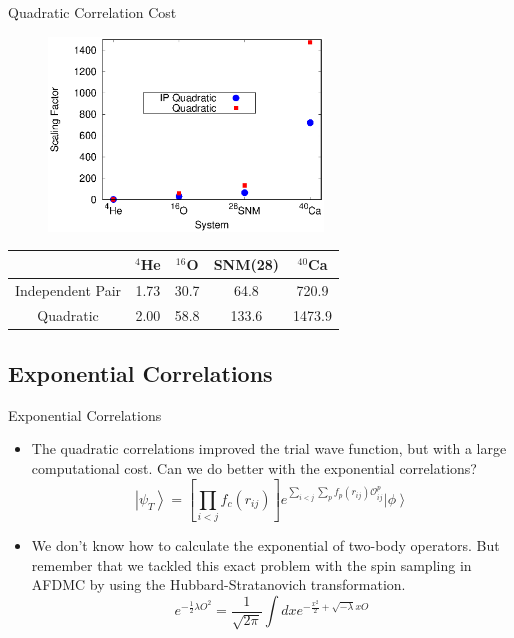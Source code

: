 \documentclass{beamer}
\newcommand{\ket}[1]{\left| #1 \right>}
\newcommand{\fpij}{f_p(r_{ij})}
\newcommand{\Opij}{\mathcal{O}_{ij}^p}
\begin{document}
\begin{frame}{Quadratic Correlation Cost}
\begin{figure}[h]
   \centering
   \includegraphics[width=0.65\textwidth]{scaling.eps}
\end{figure}
\begin{table}[h!]
   \centering
   \begin{tabular}{ccccc}
      \hline \hline
       & $^{4}$He & $^{16}$O & SNM(28) & $^{40}$Ca \\
      \hline
      Independent Pair & 1.73 & 30.7 & 64.8 & 720.9 \\
      Quadratic & 2.00 & 58.8 & 133.6 & 1473.9 \\
      \hline \hline
   \end{tabular}
\end{table}
\end{frame}

\subsection{Exponential Correlations}
\begin{frame}{Exponential Correlations}
\begin{itemize}
   \item The quadratic correlations improved the trial wave function, but with a large computational cost. Can we do better with the exponential correlations?
   \begin{equation*}
      \ket{\psi_T} = \left[\prod\limits_{i<j}f_c(r_{ij})\right] e^{\sum\limits_{i<j}\sum\limits_p\fpij\Opij} \ket{\phi}
   \end{equation*}
   \item We don't know how to calculate the exponential of two-body operators. But remember that we tackled this exact problem with the spin sampling in AFDMC by using the Hubbard-Stratanovich transformation.
\begin{equation*}
      e^{-\frac{1}{2}\lambda O^2} = \frac{1}{\sqrt{2\pi}} \int dx e^{-\frac{x^2}{2} + \sqrt{-\lambda}xO}
   \end{equation*}
\end{itemize}
\end{frame}
\end{document}
